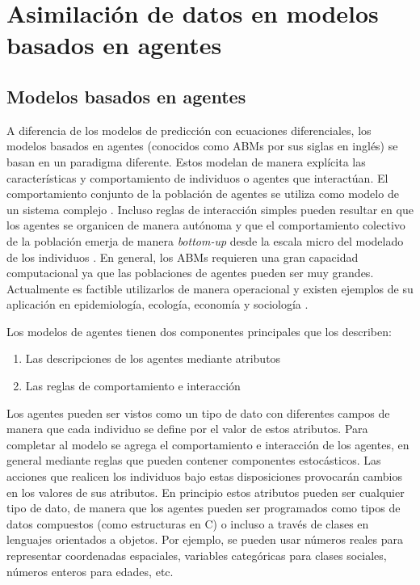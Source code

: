 \chapter{Asimilación de datos en modelos basados en agentes} \label{chp:da_abms}

\section{Modelos basados en agentes}

A diferencia de los modelos de predicción con ecuaciones diferenciales, los modelos basados en agentes (conocidos como ABMs por sus siglas en inglés) se basan en un paradigma diferente. Estos modelan de manera explícita las características y comportamiento de individuos o agentes que interactúan. El comportamiento conjunto de la población de agentes se utiliza como modelo de un sistema complejo \citep{Bonabeau2002}. Incluso reglas de interacción simples pueden resultar en que los agentes se organicen de manera autónoma y que el comportamiento colectivo de la población emerja de manera \textit{bottom-up} desde la escala micro del modelado de los individuos \citep{Helbing2012}. En general, los ABMs requieren una gran capacidad computacional ya que las poblaciones de agentes pueden ser muy grandes. Actualmente es factible utilizarlos de manera operacional y existen ejemplos de su aplicación en epidemiología, ecología, economía y sociología \citep{Vynnycky2010, Grimm2005, Tesfatsion2006, Epstein1996}.

Los modelos de agentes tienen dos componentes principales que los describen: 
\begin{enumerate}
    \item Las descripciones de los agentes mediante atributos
    \item Las reglas de comportamiento e interacción
\end{enumerate}
Los agentes pueden ser vistos como un tipo de dato con diferentes campos de manera que cada individuo se define por el valor de estos atributos. Para completar al modelo se agrega el comportamiento e interacción de los agentes, en general mediante reglas que pueden contener componentes estocásticos. Las acciones que realicen los individuos bajo estas disposiciones provocarán cambios en los valores de sus atributos. En principio estos atributos pueden ser cualquier tipo de dato, de manera que los agentes pueden ser programados como tipos de datos compuestos (como estructuras en C) o incluso a través de clases en lenguajes orientados a objetos. Por ejemplo, se pueden usar números reales para representar coordenadas espaciales, variables categóricas para clases sociales, números enteros para edades, etc.


